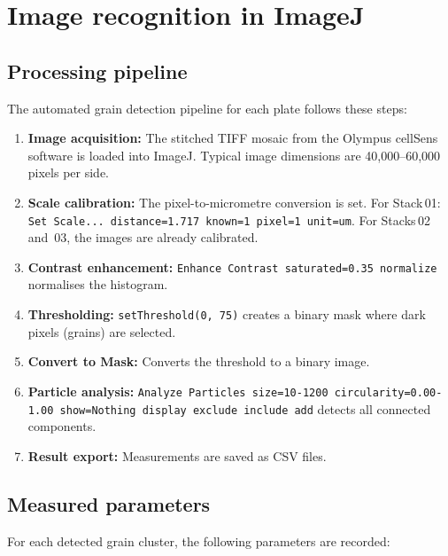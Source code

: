 \documentclass[12pt,a4paper]{article}
\begin{document}
\section{Image recognition in ImageJ}
\label{sec:recognition}

\subsection{Processing pipeline}

The automated grain detection pipeline for each plate follows these
steps:

\begin{enumerate}
  \item \textbf{Image acquisition:} The stitched TIFF mosaic from the
        Olympus cellSens software is loaded into ImageJ. Typical
        image dimensions are 40,000--60,000 pixels per side.
  \item \textbf{Scale calibration:} The pixel-to-micrometre conversion
        is set. For Stack\,01: \texttt{Set Scale... distance=1.717
        known=1 pixel=1 unit=um}. For Stacks\,02 and~03, the images
        are already calibrated.
  \item \textbf{Contrast enhancement:} \texttt{Enhance Contrast
        saturated=0.35 normalize} normalises the histogram.
  \item \textbf{Thresholding:} \texttt{setThreshold(0, 75)} creates
        a binary mask where dark pixels (grains) are selected.
  \item \textbf{Convert to Mask:} Converts the threshold to a binary
        image.
  \item \textbf{Particle analysis:} \texttt{Analyze Particles
        size=10-1200 circularity=0.00-1.00 show=Nothing display
        exclude include add} detects all connected components.
  \item \textbf{Result export:} Measurements are saved as CSV files.
\end{enumerate}

\subsection{Measured parameters}

For each detected grain cluster, the following parameters are
recorded:
\end{document}
